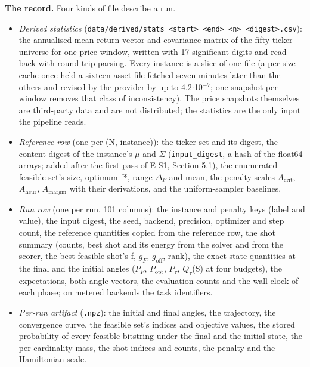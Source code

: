 \documentclass[acmsmall,screen,review]{acmart}
\begin{document}
\textbf{The record.} Four kinds of file describe a run.


\begin{itemize}
\item \textit{Derived statistics} (\texttt{data/\allowbreak{}derived/\allowbreak{}stats\_\allowbreak{}<start>\_\allowbreak{}<end>\_\allowbreak{}<n>\_\allowbreak{}<digest>.\allowbreak{}csv}): the annualised mean return vector and covariance matrix of the fifty-ticker universe for one price window, written with 17 significant digits and read back with round-trip parsing. Every instance is a slice of one file (a per-size cache once held a sixteen-asset file fetched seven minutes later than the others and revised by the provider by up to 4.2$\cdot$10$^{-7}$; one snapshot per window removes that class of inconsistency). The price snapshots themselves are third-party data and are not distributed; the statistics are the only input the pipeline reads.
\item \textit{Reference row} (one per (N, instance)): the ticker set and its digest, the content digest of the instance's $\mu$ and $\Sigma$ (\texttt{input\_digest}, a hash of the float64 arrays; added after the first pass of E-S1, Section 5.1), the enumerated feasible set's size, optimum f*, range $\Delta_{F}$ and mean, the penalty scales $A_{\mathrm{crit}}$, $A_{\mathrm{heur}}$, $A_{\mathrm{margin}}$ with their derivations, and the uniform-sampler baselines.
\item \textit{Run row} (one per run, 101 columns): the instance and penalty keys (label and value), the input digest, the seed, backend, precision, optimizer and step count, the reference quantities copied from the reference row, the shot summary (counts, best shot and its energy from the solver and from the scorer, the best feasible shot's f, $g_{F}$, $g_{\mathrm{off}}$, rank), the exact-state quantities at the final and the initial angles ($P_{F}$, $P_{\mathrm{opt}}$, $P_{\tau}$, $Q_{\tau}$(S) at four budgets), the expectations, both angle vectors, the evaluation counts and the wall-clock of each phase; on metered backends the task identifiers.
\item \textit{Per-run artifact} (\texttt{.npz}): the initial and final angles, the trajectory, the convergence curve, the feasible set's indices and objective values, the stored probability of every feasible bitstring under the final and the initial state, the per-cardinality mass, the shot indices and counts, the penalty and the Hamiltonian scale.
\end{itemize}
\end{document}
